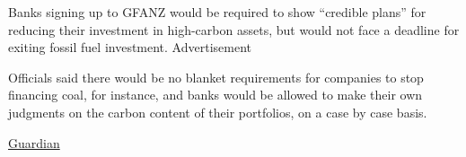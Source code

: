\documentclass[
]{book}
\begin{document}
Banks signing up to GFANZ would be required to show ``credible plans'' for reducing their investment in high-carbon assets, but would not face a deadline for exiting fossil fuel investment.
Advertisement

Officials said there would be no blanket requirements for companies to stop financing coal, for instance, and banks would be allowed to make their own judgments on the carbon content of their portfolios, on a case by case basis.

\href{https://www.theguardian.com/business/2021/apr/21/leading-finance-firms-sign-up-to-mark-carney-forum-on-low-carbon-investment}{Guardian}

  
\end{document}
